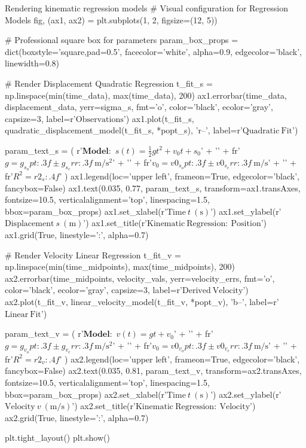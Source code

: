 \begin{pycode}{Rendering kinematic regression models}
# Visual configuration for Regression Models
fig, (ax1, ax2) = plt.subplots(1, 2, figsize=(12, 5))

# Professional square box for parameters
param_box_props = dict(boxstyle='square,pad=0.5', facecolor='white', 
                       alpha=0.9, edgecolor='black', linewidth=0.8)

# Render Displacement Quadratic Regression
t_fit_s = np.linspace(min(time_data), max(time_data), 200)
ax1.errorbar(time_data, displacement_data, yerr=sigma_s, fmt='o', color='black', 
             ecolor='gray', capsize=3, label=r'$\mathrm{Observations}$')
ax1.plot(t_fit_s, quadratic_displacement_model(t_fit_s, *popt_s), 'r--', 
         label=r'$\mathrm{Quadratic \ Fit}$')

param_text_s = (
    r'$\mathbf{Model:}$ $s(t) = \frac{1}{2}gt^2 + v_0t + s_0$' + '\n' +
    fr'$g = {g_s_opt:.3f} \pm {g_s_err:.3f} \ \mathrm{{m/s^2}}$' + '\n' +
    fr'$v_0 = {v0_s_opt:.3f} \pm {v0_s_err:.3f} \ \mathrm{{m/s}}$' + '\n' +
    fr'$R^2 = {r2_s:.4f}$'
)
ax1.legend(loc='upper left', frameon=True, edgecolor='black', fancybox=False)
ax1.text(0.035, 0.77, param_text_s, transform=ax1.transAxes, fontsize=10.5,
         verticalalignment='top', linespacing=1.5, bbox=param_box_props)
ax1.set_xlabel(r'$\mathrm{Time} \ t \ (\mathrm{s})$')
ax1.set_ylabel(r'$\mathrm{Displacement} \ s \ (\mathrm{m})$')
ax1.set_title(r'$\mathrm{Kinematic \ Regression: \ Position}$')
ax1.grid(True, linestyle=':', alpha=0.7)

# Render Velocity Linear Regression
t_fit_v = np.linspace(min(time_midpoints), max(time_midpoints), 200)
ax2.errorbar(time_midpoints, velocity_vals, yerr=velocity_errs, fmt='o', color='black', 
             ecolor='gray', capsize=3, label=r'$\mathrm{Derived \ Velocity}$')
ax2.plot(t_fit_v, linear_velocity_model(t_fit_v, *popt_v), 'b--', 
         label=r'$\mathrm{Linear \ Fit}$')

param_text_v = (
    r'$\mathbf{Model:}$ $v(t) = gt + v_0$' + '\n' +
    fr'$g = {g_v_opt:.3f} \pm {g_v_err:.3f} \ \mathrm{{m/s^2}}$' + '\n' +
    fr'$v_0 = {v0_v_opt:.3f} \pm {v0_v_err:.3f} \ \mathrm{{m/s}}$' + '\n' +
    fr'$R^2 = {r2_v:.4f}$'
)
ax2.legend(loc='upper left', frameon=True, edgecolor='black', fancybox=False)
ax2.text(0.035, 0.81, param_text_v, transform=ax2.transAxes, fontsize=10.5,
         verticalalignment='top', linespacing=1.5, bbox=param_box_props)
ax2.set_xlabel(r'$\mathrm{Time} \ t \ (\mathrm{s})$')
ax2.set_ylabel(r'$\mathrm{Velocity} \ v \ (\mathrm{m/s})$')
ax2.set_title(r'$\mathrm{Kinematic \ Regression: \ Velocity}$')
ax2.grid(True, linestyle=':', alpha=0.7)

plt.tight_layout()
plt.show()
\end{pycode}

